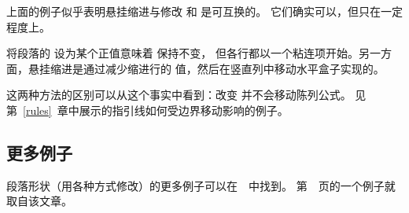 \documentclass{book}
\begin{document}
上面的例子似乎表明悬挂缩进与修改  和  是可互换的。
它们确实可以，但只在一定程度上。
\altt

将段落的  设为某个正值意味着  保持不变，
但各行都以一个粘连项开始。另一方面，悬挂缩进是通过减少缩进行的
 值，然后在竖直列中移动水平盒子实现的。

这两种方法的区别可以从这个事实中看到：改变  并不会移动陈列公式。
见第~\ref{rules}~章中展示的指引线如何受边界移动影响的例子。

\subsection{更多例子}

段落形状（用各种方式修改）的更多例子可以在~\cite{E1}~中找到。
第~\pageref{varioset}~页的一个例子就取自该文章。

{}
\endofchapter
\end{document}
